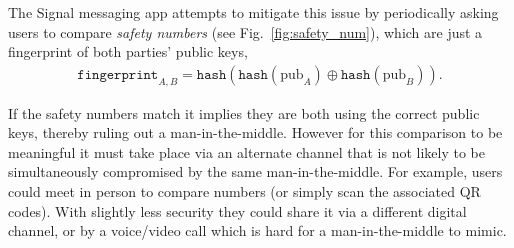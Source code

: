 The Signal messaging app attempts to mitigate this issue by periodically asking users to compare \emph{safety numbers} (see Fig.~\ref{fig:safety_num}), which are just a fingerprint of both parties' public keys,
\begin{align}
	\texttt{fingerprint}_{A,B} = \texttt{hash}(\texttt{hash}(\mathrm{pub}_A)\oplus\texttt{hash}(\mathrm{pub}_B)).
\end{align}

If the safety numbers match it implies they are both using the correct public keys, thereby ruling out a man-in-the-middle. However for this comparison to be meaningful it must take place via an alternate channel that is not likely to be simultaneously compromised by the same man-in-the-middle. For example, users could meet in person to compare numbers (or simply scan the associated QR codes). With slightly less security they could share it via a different digital channel, or by a voice/video call which is hard for a man-in-the-middle to mimic.

